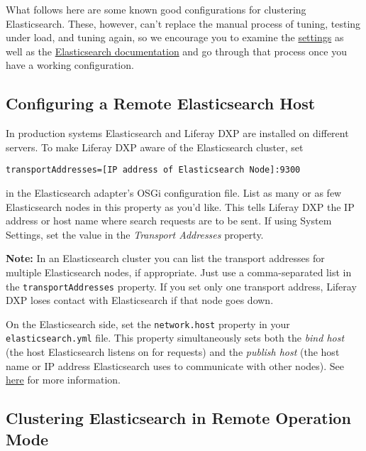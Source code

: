What follows here are some known good configurations for clustering
Elasticsearch. These, however, can't replace the manual process of
tuning, testing under load, and tuning again, so we encourage you to
examine the
\href{/docs/7-0/deploy/-/knowledge_base/d/elasticsearch-settings}{settings}
as well as the
\href{https://www.elastic.co/guide/en/elasticsearch/reference/2.4/setup.html}{Elasticsearch
documentation} and go through that process once you have a working
configuration.

\subsection{Configuring a Remote Elasticsearch
Host}\label{configuring-a-remote-elasticsearch-host}

In production systems Elasticsearch and Liferay DXP are installed on
different servers. To make Liferay DXP aware of the Elasticsearch
cluster, set

\begin{verbatim}
transportAddresses=[IP address of Elasticsearch Node]:9300
\end{verbatim}

in the Elasticsearch adapter's OSGi configuration file. List as many or
as few Elasticsearch nodes in this property as you'd like. This tells
Liferay DXP the IP address or host name where search requests are to be
sent. If using System Settings, set the value in the \emph{Transport
Addresses} property.

\noindent\hrulefill

\textbf{Note:} In an Elasticsearch cluster you can list the transport
addresses for multiple Elasticsearch nodes, if appropriate. Just use a
comma-separated list in the \texttt{transportAddresses} property. If you
set only one transport address, Liferay DXP loses contact with
Elasticsearch if that node goes down.

\noindent\hrulefill

On the Elasticsearch side, set the \texttt{network.host} property in
your \texttt{elasticsearch.yml} file. This property simultaneously sets
both the \emph{bind host} (the host Elasticsearch listens on for
requests) and the \emph{publish host} (the host name or IP address
Elasticsearch uses to communicate with other nodes). See
\href{https://www.elastic.co/guide/en/elasticsearch/reference/2.4/modules-network.html}{here}
for more information.

\subsection{Clustering Elasticsearch in Remote Operation
Mode}\label{clustering-elasticsearch-in-remote-operation-mode}

